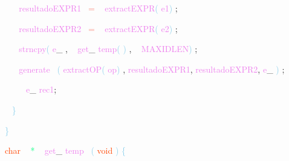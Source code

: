 \documentclass[8, usernames, dvipsnames]{beamer}
\begin{document}
\begin{frame}
\textcolor{White}{\   }
\textcolor{White}{\   }
\textcolor{Violet}{resultadoEXPR1}\textcolor{White}{\ }
\textcolor{Salmon}{=}
\textcolor{White}{\ }
\textcolor{Violet}{extractEXPR}\textcolor{SkyBlue}{(}
\textcolor{Violet}{e1}\textcolor{SkyBlue}{)}
\textcolor{Sepia}{;}

 \textcolor{White}{\   }
\textcolor{White}{\   }
\textcolor{Violet}{resultadoEXPR2}\textcolor{White}{\ }
\textcolor{Salmon}{=}
\textcolor{White}{\ }
\textcolor{Violet}{extractEXPR}\textcolor{SkyBlue}{(}
\textcolor{Violet}{e2}\textcolor{SkyBlue}{)}
\textcolor{Sepia}{;}

 \textcolor{White}{\   }
\textcolor{White}{\   }
\textcolor{Violet}{strncpy}\textcolor{SkyBlue}{(}
\textcolor{Violet}{e}\textcolor{Sepia}{\_}
\textcolor{Sepia}{,}
\textcolor{White}{\ }
\textcolor{Violet}{get}\textcolor{Sepia}{\_}
\textcolor{Violet}{temp}\textcolor{SkyBlue}{(}
\textcolor{SkyBlue}{)}
\textcolor{Sepia}{,}
\textcolor{White}{\ }
\textcolor{Violet}{MAXIDLEN}\textcolor{SkyBlue}{)}
\textcolor{Sepia}{;}

 \textcolor{White}{\   }
\textcolor{White}{\   }
\textcolor{Violet}{generate}\textcolor{White}{\ }
\textcolor{SkyBlue}{(}
\textcolor{Violet}{extractOP}\textcolor{SkyBlue}{(}
\textcolor{Violet}{op}\textcolor{SkyBlue}{)}
\textcolor{Sepia}{,}
\textcolor{Violet}{resultadoEXPR1}\textcolor{Sepia}{,}
\textcolor{Violet}{resultadoEXPR2}\textcolor{Sepia}{,}
\textcolor{Violet}{e}\textcolor{Sepia}{\_}
\textcolor{SkyBlue}{)}
\textcolor{Sepia}{;}

 \textcolor{White}{\   }
\textcolor{White}{\   }
\textcolor{OrangeRed}{	}
\textcolor{White}{\ }
\textcolor{Violet}{e}\textcolor{Sepia}{\_}
\textcolor{Violet}{rec1}\textcolor{Sepia}{;}

 \textcolor{White}{\   }
\textcolor{SkyBlue}{\} }

 \textcolor{SkyBlue}{\} }

 
 \textcolor{OrangeRed}{char}
\textcolor{White}{\ }
\textcolor{SpringGreen}{*}
\textcolor{White}{\ }
\textcolor{Violet}{get}\textcolor{Sepia}{\_}
\textcolor{Violet}{temp}\textcolor{White}{\ }
\textcolor{SkyBlue}{(}
\textcolor{OrangeRed}{void}
\textcolor{SkyBlue}{)}
\textcolor{SkyBlue}{\{ }

 
 \end{frame}
\end{document}

